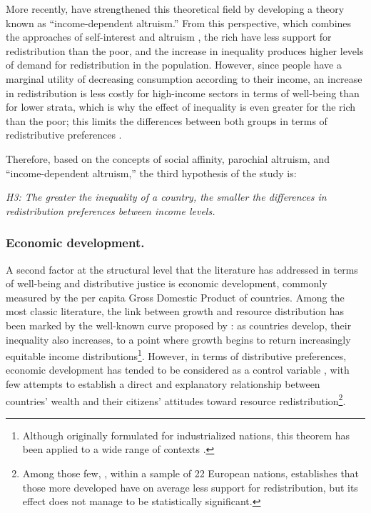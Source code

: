 \documentclass[utf8]{frontiersSCNS} %
\begin{document}
More recently, \textcite{Dimick2016, Dimick2018} have strengthened this theoretical field by developing a theory known as “income-dependent altruism.” From this perspective, which combines the approaches of self-interest and altruism \parencite{Dimick2018}, the rich have less support for redistribution than the poor, and the increase in inequality produces higher levels of demand for redistribution in the population. However, since people have a marginal utility of decreasing consumption according to their income, an increase in redistribution is less costly for high-income sectors in terms of well-being than for lower strata, which is why the effect of inequality is even greater for the rich than the poor; this limits the differences between both groups in terms of redistributive preferences \parencite{Dimick2016}.

Therefore, based on the concepts of social affinity, parochial altruism, and “income-dependent altruism,” the third hypothesis of the study is:

\textit{H3: The greater the inequality of a country, the smaller the differences in redistribution preferences between income levels.}

\subsubsection{Economic development.}

A second factor at the structural level that the literature has addressed in terms of well-being and distributive justice is economic development, commonly measured by the per capita Gross Domestic Product of countries. Among the most classic literature, the link between growth and resource distribution has been marked by the well-known curve proposed by \textcite{KuznetsEconomicGrowthIncome1955}: as countries develop, their inequality also increases, to a point where growth begins to return increasingly equitable income distributions\footnote{Although originally formulated for industrialized nations, this theorem has been applied to a wide range of contexts \parencite{alvaredo2010rich, AtkinsonTopIncomesLong2011, WilliamsonLatinAmericanInequality2015}.}.  However, in terms of distributive preferences, economic development has tended to be considered as a control variable \parencite{RudraGlobalizationDeclineWelfare2002, Schmidt-CatranEconomicinequalitypublic2016, SchroderIncomeInequalityRelated2017}, with few attempts to establish a direct and explanatory relationship between countries’ wealth and their citizens’ attitudes toward resource redistribution\footnote{Among those few, \textcite{FinseraasIncomeInequalityDemand2009}, within a sample of 22 European nations, establishes that those more developed have on average less support for redistribution, but its effect does not manage to be statistically significant.}.
\end{document}
